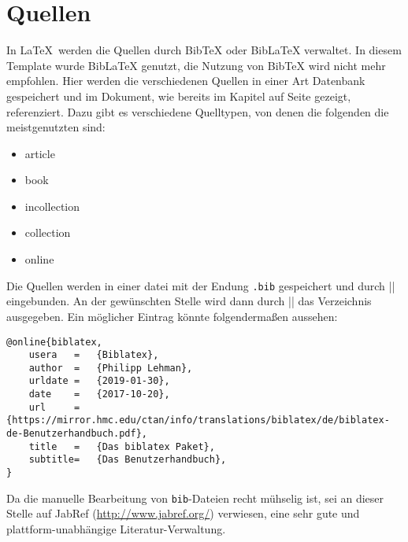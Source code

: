 
\chapter{Quellen}

In \LaTeX\ werden die Quellen durch BibTeX oder BibLaTeX verwaltet. 
In diesem Template wurde BibLaTeX genutzt, die Nutzung von BibTeX wird nicht mehr empfohlen.
Hier werden die verschiedenen Quellen in einer Art Datenbank gespeichert und im Dokument, wie bereits im Kapitel  auf Seite \pageref{ch:zitieren} gezeigt, referenziert. 
Dazu gibt es verschiedene Quelltypen, von denen die folgenden die meistgenutzten sind:

\begin{itemize}
  \item article
  \item book
  \item incollection
  \item collection
  \item online
\end{itemize}

Die Quellen werden in einer datei mit der Endung \texttt{.bib} gespeichert und durch \befehl|| eingebunden. 
An der gewünschten Stelle wird dann durch \befehl|\printbibliography| das Verzeichnis ausgegeben. 
Ein möglicher Eintrag könnte folgendermaßen aussehen:

\begin{lstlisting}
@online{biblatex,
    usera	=	{Biblatex},
    author	=	{Philipp Lehman},
    urldate	=	{2019-01-30},
    date	=	{2017-10-20},
    url		=	{https://mirror.hmc.edu/ctan/info/translations/biblatex/de/biblatex-de-Benutzerhandbuch.pdf},
    title	=	{Das biblatex Paket},
    subtitle=   {Das Benutzerhandbuch},
}
\end{lstlisting}

Da die manuelle Bearbeitung von \texttt{bib}-Dateien recht mühselig ist, sei an dieser Stelle auf JabRef (\url{http://www.jabref.org/}) verwiesen, eine sehr gute und plattform-unabhängige Literatur-Verwaltung.